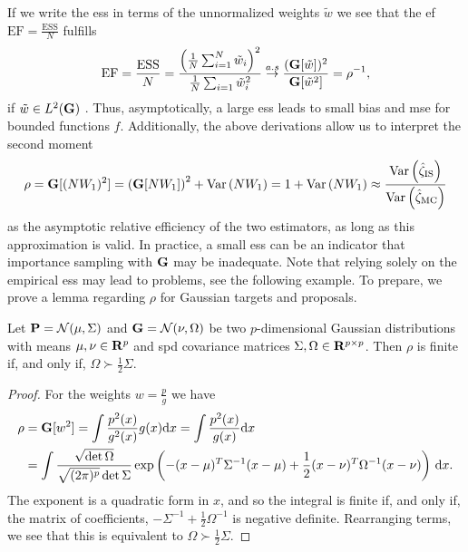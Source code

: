 If we write the \acrshort{ess} in terms of the unnormalized weights $\tilde w$ we see that the \gls{ef} $\text{EF} = \frac{\text{ESS}}{N}$ fulfills
$$
\text{EF} = \frac{\text{ESS}}{N} = \frac{\left(\frac{1}{N}\sum_{i = 1}^{N} \tilde w_{i}\right)^{2}}{\frac{1}{N}\sum_{i = 1} \tilde w_{i}^2} \stackrel{a.s}{\to} \frac{(\G [\tilde w])^{2}}{\G [\tilde w^{2}]} = \rho^{-1},
$$
if $\tilde w \in L^{2}(\G)$ \citep[Section 2.3.2]{Agapiou2017Importance}. Thus, asymptotically, a large \acrshort{ess} leads to small bias and \acrshort{mse} for bounded functions $f$. Additionally, the above derivations allow us to interpret the second moment
$$
\rho = \G [(NW_1)^2] = \left(\G [NW_1]\right)^{2} + \var \left( NW_1 \right) = 1 + \var \left(NW_1\right) \approx \frac{\var \left(\hat\zeta_{\text{IS}}\right)}{\var \left(\hat\zeta_{\text{MC}}\right)}
$$
as the asymptotic relative efficiency of the two estimators, as long as this approximation is valid. In practice, a small \acrshort{ess} can be an indicator that importance sampling with $\G$ may be inadequate. Note that relying solely on the empirical \acrshort{ess} may lead to problems, see the following example. To prepare, we prove a lemma regarding $\rho$ for Gaussian targets and proposals.

\begin{lemma}
    Let $\P = \mathcal N(\mu, \Sigma)$ and $\G = \mathcal N(\nu, \Omega)$ be two $p$-dimensional Gaussian distributions with means $\mu,\nu \in \R^{p}$ and \acrshort{spd} covariance matrices $\Sigma,\Omega \in \R^{p\times p}$. 
    Then $\rho$ is finite if, and only if, $\Omega \succ \frac{1}{2} \Sigma$. 
\end{lemma}

\begin{proof}
    For the weights $w = \frac{p}{g}$ we have
    \begin{align*}
        \rho &= \G [w^{2}] = \int \frac{p^{2}(x)}{g^{2}(x)} g(x) \mathrm d x = \int \frac{p^{2}(x)}{g(x)} \mathrm d x \\
        &= \int \frac{\sqrt{\det \Omega}}{\sqrt{(2\pi)^{p}}\det \Sigma} \exp \left( -(x - \mu)^{T}\Sigma^{-1}(x - \mu) + \frac{1}{2}(x - \nu)^{T}\Omega^{-1}(x - \nu)\right) \d x. 
    \end{align*}
    The exponent is a quadratic form in $x$, and so the integral is finite if, and only if, the matrix of coefficients, $-\Sigma^{-1} + \frac{1}{2}\Omega^{-1}$ is negative definite. Rearranging terms, we see that this is equivalent to $\Omega \succ \frac{1}{2}\Sigma$.
\end{proof}

